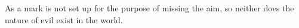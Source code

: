 As a mark is not set up for the purpose of missing the aim, so neither does the
nature of evil exist in the world.
